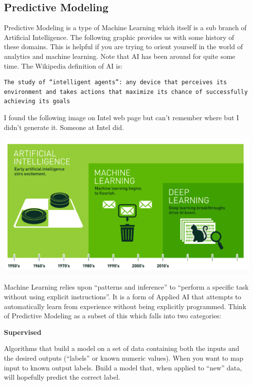 \documentclass[
]{article}
\begin{document}
\hypertarget{predictive-modeling}{%
\subsection{Predictive Modeling}\label{predictive-modeling}}

Predictive Modeling is a type of Machine Learning which itself is a sub
branch of Artificial Intelligence. The following graphic provides us
with some history of these domains. This is helpful if you are trying to
orient yourself in the world of analytics and machine learning. Note
that AI has been around for quite some time. The Wikipedia definition of
AI is:

\begin{verbatim}
The study of “intelligent agents”: any device that perceives its environment and takes actions that maximize its chance of successfully achieving its goals
\end{verbatim}

I found the following image on Intel web page but can't remember where
but I didn't generate it. Someone at Intel did.

\includegraphics{./IMG/intel.png}

Machine Learning relies upon ``patterns and inference'' to ``perform a
specific task without using explicit instructions''. It is a form of
Applied AI that attempts to automatically learn from experience without
being explicitly programmed. Think of Predictive Modeling as a subset of
this which falls into two categories:

\textbf{Supervised}

Algorithms that build a model on a set of data containing both the
inputs and the desired outputs (``labels'' or known numeric values).
When you want to map input to known output labels. Build a model that,
when applied to ``new'' data, will hopefully predict the correct label.
\end{document}
